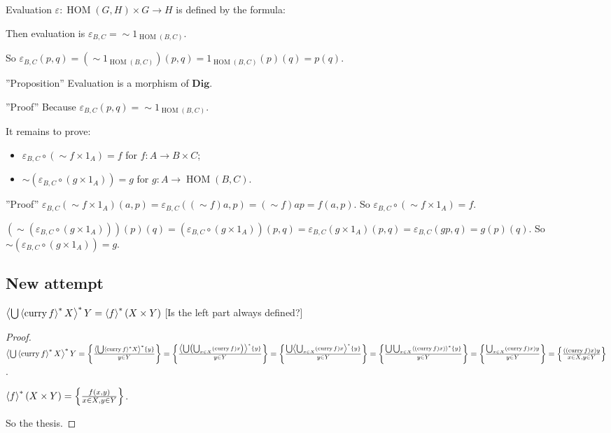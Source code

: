 Evaluation $\varepsilon : \operatorname{HOM} ( G , H) \times G \rightarrow H$ is defined by the formula:

Then evaluation is $\varepsilon_{B, C} = \mathop{\sim} 1_{\operatorname{HOM}(B,C)}$.

So $\varepsilon_{B, C} ( p , q) = ( \mathop{\sim} 1_{\operatorname{HOM}(B,C)}) ( p , q) = 1_{\operatorname{HOM}(B,C)} ( p) ( q) = p ( q)$.

''Proposition'' Evaluation is a morphism of $\mathbf{Dig}$.

''Proof'' Because $\varepsilon_{B, C} ( p , q) = \mathop{\sim} 1_{\operatorname{HOM}(B,C)}$.

It remains to prove:
\begin{itemize}
\item $\varepsilon_{B, C} \circ ( \sim f \times 1_{A}) = f$ for $f : A \rightarrow B \times C$;
\item $\sim ( \varepsilon_{B, C} \circ ( g \times 1_{A})) = g$ for $g : A \rightarrow \operatorname{HOM} ( B , C)$.
\end{itemize}

''Proof'' $\varepsilon_{B, C} ( \sim f \times 1_{A}) ( a , p) = \varepsilon_{B, C} ( ( \sim f) a , p) = ( \sim f) a p = f ( a , p)$. So $\varepsilon_{B, C} \circ ( \sim f \times 1_{A}) = f$.

  $(\sim ( \varepsilon_{B, C} \circ ( g \times 1_{A}))) ( p) ( q) = ( \varepsilon_{B, C} \circ ( g \times 1_{A})) ( p , q) = \varepsilon_{B, C} ( g \times 1_{A}) ( p , q) = \varepsilon_{B, C} ( g p , q) = g ( p) ( q)$. So $\sim ( \varepsilon_{B, C} \circ ( g \times 1_{A})) = g$.

\subsection{New attempt}

\begin{prop}
$\left\langle \bigcup\left\langle \operatorname{curry} f\right\rangle ^{\ast}X\right\rangle ^{\ast}Y=
\left\langle f\right\rangle ^{\ast}(X\times Y)$
[Is the left part always defined?]
\end{prop}

\begin{proof}
$\left\langle \bigcup\left\langle \operatorname{curry} f\right\rangle ^{\ast}X\right\rangle ^{\ast}Y=\left\{ \frac{\left\langle \bigcup\left\langle \operatorname{curry} f\right\rangle ^{\ast}X\right\rangle ^{\ast}\{y\}}{y\in Y}\right\}=
\left\{ \frac{\left\langle \bigcup\left(\bigcup_{x\in X}(\operatorname{curry} f)x\right)\right\rangle ^{\ast}\{y\}}{y\in Y}\right\}=
\left\{ \frac{\bigcup\left\langle \bigcup_{x\in X}(\operatorname{curry} f)x\right\rangle ^{\ast}\{y\}}{y\in Y}\right\}=
\left\{ \frac{\bigcup\bigcup_{x\in X}\left\langle (\operatorname{curry} f)x)\right\rangle ^{\ast}\{y\}}{y\in Y}\right\}=
\left\{ \frac{\bigcup_{x\in X}(\operatorname{curry} f)x)y}{y\in Y}\right\}=
\left\{ \frac{((\operatorname{curry} f)x)y}{x\in X,y\in Y}\right\}$.

$\left\langle f\right\rangle ^{\ast}(X\times Y)=\left\{ \frac{f(x,y)}{x\in X,y\in Y}\right\}$.

So the thesis.
\end{proof}

